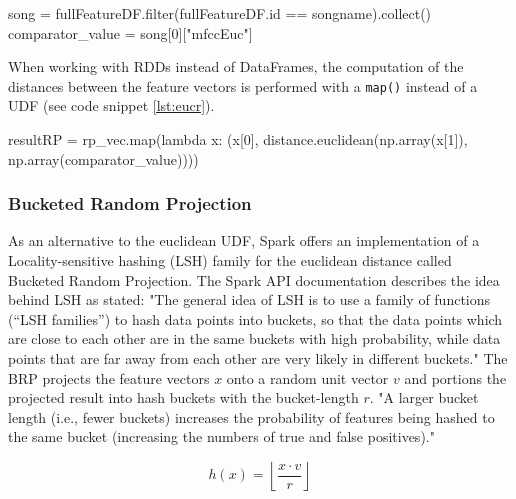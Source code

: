 \begin{pythonCode}[frame=single,label={lst:comp},caption={Filter for requested song},captionpos=b]
song = fullFeatureDF.filter(fullFeatureDF.id == songname).collect()
comparator_value = song[0]["mfccEuc"]
\end{pythonCode}

\noindent When working with RDDs instead of DataFrames, the computation of the distances between the feature vectors is performed with a \lstinline{map()} instead of a UDF (see code snippet \ref{lst:eucr}). 

\begin{pythonCode}[frame=single,label={lst:eucr},caption={euclidean distance RDD},captionpos=b]
resultRP = rp_vec.map(lambda x: (x[0], distance.euclidean(np.array(x[1]), np.array(comparator_value))))
\end{pythonCode}

\subsubsection{Bucketed Random Projection}

As an alternative to the euclidean UDF, Spark offers an implementation of a Locality-sensitive hashing (LSH) family for the euclidean distance called Bucketed Random Projection. The Spark API documentation describes the idea behind LSH as stated: "The general idea of LSH is to use a family of functions (“LSH families”) to hash data points into buckets, so that the data points which are close to each other are in the same buckets with high probability, while data points that are far away from each other are very likely in different buckets." \cite{lshspark} The BRP projects the feature vectors $x$ onto a random unit vector $v$ and portions the projected result into hash buckets with the bucket-length $r$. "A larger bucket length (i.e., fewer buckets) increases the probability of features being hashed to the same bucket (increasing the numbers of true and false positives)." \cite{lshspark}

\begin{equation} \label{eq:brp}
h(x) = \left \lfloor{\frac{x \cdot v}{r}}\right \rfloor 
\end{equation}

